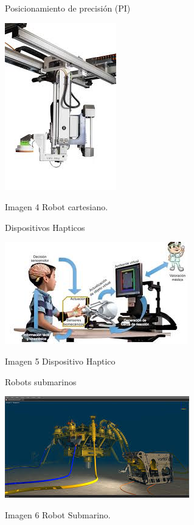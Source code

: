 \documentclass[12pt,a4paper]{article}
\begin{document}
Posicionamiento de precisión (PI)
\begin{center}
\includegraphics[scale=1]{3.jpg} 
\end{center}
\begin{center}
Imagen 4 Robot cartesiano.
\end{center}
\newpage
Dispositivos Hapticos 
\\
\begin{center}
\includegraphics[scale=1.2]{5.jpg} 
\end{center}
\begin{center}
Imagen 5 Dispositivo Haptico
\end{center}

Robots submarinos 
\begin{center}
\includegraphics[scale=1.3]{6.jpg} 
\end{center}
\begin{center}
Imagen 6 Robot Submarino.
\end{center}
\end{document}
